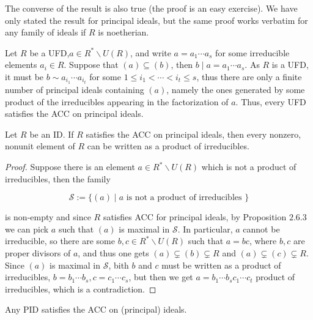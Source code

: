 \begin{remark}
    The converse of the result is also true (the proof is an easy exercise). We have only stated the result for principal ideals, but the same proof works verbatim for any family of ideals if $R$ is noetherian.
\end{remark} 

\begin{example}
    Let $R$ be a UFD,$a \in R^{*} \backslash U(R)$, and write $a=a_{1} \cdots a_{s}$ for some irreducible elements $a_{i} \in R$. Suppose that $(a) \subseteq(b)$, then $b \mid a=a_{1} \cdots a_{s}$. As $R$ is a UFD, it must be $b \sim a_{i_{1}} \cdots a_{i_{t}}$ for some $1 \leq i_{1}<\cdots<i_{t} \leq s$, thus there are only a finite number of principal ideals containing $(a)$, namely the ones generated by some product of the irreducibles appearing in the factorization of $a$. Thus, every UFD satisfies the ACC on principal ideals.
\end{example}

\begin{proposition}
    Let $R$ be an ID. If $R$ satisfies the ACC on principal ideals, then every nonzero, nonunit element of $R$ can be written as a product of irreducibles.
\end{proposition} 
\begin{proof}
    Suppose there is an element $a \in R^{*} \backslash U(R)$ which is not a product of irreducibles, then the family

    $$
    \mathcal{S}:=\{(a) \mid a \text { is not a product of irreducibles }\}
    $$
    
    is non-empty and since $R$ satisfies ACC for principal ideals, by Proposition $2.6 .3$ we can pick $a$ such that $(a)$ is maximal in $\mathcal{S}$. In particular, $a$ cannot be irreducible, so there are some $b, c \in R^{*} \backslash U(R)$ such that $a=b c$, where $b, c$ are proper divisors of $a$, and thus one gets $(a) \subsetneq(b) \subsetneq R$ and $(a) \subsetneq(c) \subsetneq R$. Since $(a)$ is maximal in $\mathcal{S}$, bith $b$ and $c$ must be written as a product of irreducibles, $b=b_{1} \cdots b_{s}, c=c_{1} \cdots c_{s}$, but then we get $a=b_{1} \cdots b_{s} c_{1} \cdots c_{t}$ product of irreducibles, which is a contradiction. 
\end{proof} 

\begin{proposition}
    Any PID satisfies the ACC on (principal) ideals.
\end{proposition}

